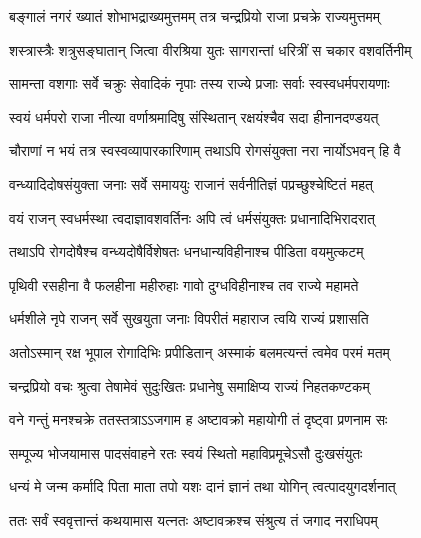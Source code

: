 
\twolineshloka
{बङ्गालं नगरं ख्यातं शोभाभद्राख्यमुत्तमम्}
{तत्र चन्द्रप्रियो राजा प्रचक्रे राज्यमुत्तमम्} %

\twolineshloka
{शस्त्रास्त्रैः शत्रुसङ्घातान् जित्वा वीरश्रिया युतः}
{सागरान्तां धरित्रीं स चकार वशवर्तिनीम्} %

\twolineshloka
{सामन्ता वशगाः सर्वे चक्रुः सेवादिकं नृपाः}
{तस्य राज्ये प्रजाः सर्वाः स्वस्वधर्मपरायणाः} %

\twolineshloka
{स्वयं धर्मपरो राजा नीत्या वर्णाश्रमादिषु}
{संस्थितान् रक्षयंश्चैव सदा हीनानदण्डयत्} %

\twolineshloka
{चौराणां न भयं तत्र स्वस्वव्यापारकारिणाम्}
{तथाऽपि रोगसंयुक्ता नरा नार्योऽभवन् हि वै} %

\twolineshloka
{वन्ध्यादिदोषसंयुक्ता जनाः सर्वे समाययुः}
{राजानं सर्वनीतिज्ञं पप्रच्छुश्चेष्टितं महत्} %


\twolineshloka
{वयं राजन् स्वधर्मस्था त्वदाज्ञावशवर्तिनः}
{अपि त्वं धर्मसंयुक्तः प्रधानादिभिरादरात्} %

\twolineshloka
{तथाऽपि रोगदोषैश्च वन्ध्यदोषैर्विशेषतः}
{धनधान्यविहीनाश्च पीडिता वयमुत्कटम्} %

\twolineshloka
{पृथिवी रसहीना वै फलहीना महीरुहाः}
{गावो दुग्धविहीनाश्च तव राज्ये महामते} %

\twolineshloka
{धर्मशीले नृपे राजन् सर्वे सुखयुता जनाः}
{विपरीतं महाराज त्वयि राज्यं प्रशासति} %

\twolineshloka
{अतोऽस्मान् रक्ष भूपाल रोगादिभिः प्रपीडितान्}
{अस्माकं बलमत्यन्तं त्वमेव परमं मतम्} %


\twolineshloka
{चन्द्रप्रियो वचः श्रुत्वा तेषामेवं सुदुःखितः}
{प्रधानेषु समाक्षिप्य राज्यं निहतकण्टकम्} %

\twolineshloka
{वने गन्तुं मनश्चक्रे ततस्तत्राऽऽजगाम ह}
{अष्टावक्रो महायोगी तं दृष्ट्वा प्रणनाम सः} %

\twolineshloka
{सम्पूज्य भोजयामास पादसंवाहने रतः}
{स्वयं स्थितो महाविप्रमूचेऽसौ दुःखसंयुतः} %


\twolineshloka
{धन्यं मे जन्म कर्मादि पिता माता तपो यशः}
{दानं ज्ञानं तथा योगिन् त्वत्पादयुगदर्शनात्} %

\twolineshloka
{ततः सर्वं स्ववृत्तान्तं कथयामास यत्नतः}
{अष्टावक्रश्च संश्रुत्य तं जगाद नराधिपम्} %



